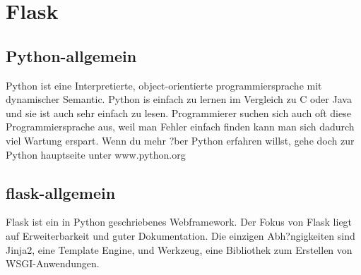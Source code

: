 \documentclass{article}
\begin{document}








\cleardoublepage



\section{Flask}


\subsection{Python-allgemein}

Python ist eine Interpretierte, object-orientierte programmiersprache mit dynamischer Semantic.
Python is einfach zu lernen im Vergleich zu C oder Java und sie ist auch sehr einfach zu lesen.
Programmierer suchen sich auch oft diese Programmiersprache aus, weil man Fehler einfach finden kann man sich dadurch viel Wartung erspart.
Wenn du mehr ?ber Python erfahren willst, gehe doch zur Python hauptseite unter www.python.org
\subsection{flask-allgemein}

Flask ist ein in Python geschriebenes Webframework. Der Fokus von Flask liegt auf Erweiterbarkeit und guter Dokumentation.
Die einzigen Abh?ngigkeiten sind Jinja2,
eine Template Engine, und Werkzeug, eine Bibliothek zum Erstellen von WSGI-Anwendungen.
\end{document}

